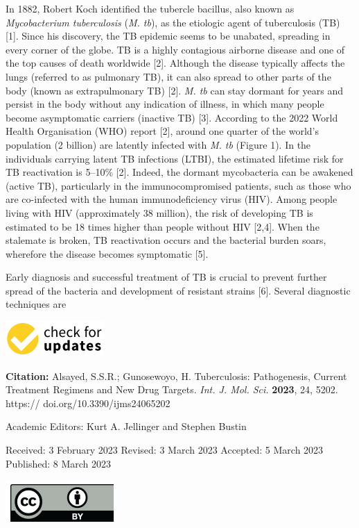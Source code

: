 \documentclass{article}
\begin{document}
In 1882, Robert Koch identified the tubercle bacillus, also known as \textit{Mycobacterium tuberculosis} (\textit{M. tb}), as the etiologic agent of tuberculosis (TB) [1]. Since his discovery, the TB epidemic seems to be unabated, spreading in every corner of the globe. TB is a highly contagious airborne disease and one of the top causes of death worldwide [2]. Although the disease typically affects the lungs (referred to as pulmonary TB), it can also spread to other parts of the body (known as extrapulmonary TB) [2]. \textit{M. tb} can stay dormant for years and persist in the body without any indication of illness, in which many people become asymptomatic carriers (inactive TB) [3]. According to the 2022 World Health Organisation (WHO) report [2], around one quarter of the world's population (2 billion) are latently infected with \textit{M. tb} (Figure 1). In the individuals carrying latent TB infections (LTBI), the estimated lifetime risk for TB reactivation is 5–10\% [2]. Indeed, the dormant mycobacteria can be awakened (active TB), particularly in the immunocompromised patients, such as those who are co-infected with the human immunodeficiency virus (HIV). Among people living with HIV (approximately 38 million), the risk of developing TB is estimated to be 18 times higher than people without HIV [2,4]. When the stalemate is broken, TB reactivation occurs and the bacterial burden soars, wherefore the disease becomes symptomatic [5].

Early diagnosis and successful treatment of TB is crucial to prevent further spread of the bacteria and development of resistant strains [6]. Several diagnostic techniques are


\includegraphics{_page_0_Picture_12.png}


\textbf{Citation:} Alsayed, S.S.R.; Gunosewoyo, H. Tuberculosis: Pathogenesis, Current Treatment Regimens and New Drug Targets. \textit{Int. J. Mol. Sci.} \textbf{2023}, 24, 5202. https:// doi.org/10.3390/ijms24065202

Academic Editors: Kurt A. Jellinger and Stephen Bustin

Received: 3 February 2023 Revised: 3 March 2023 Accepted: 5 March 2023 Published: 8 March 2023


\includegraphics{_page_0_Picture_16.png}
\end{document}
